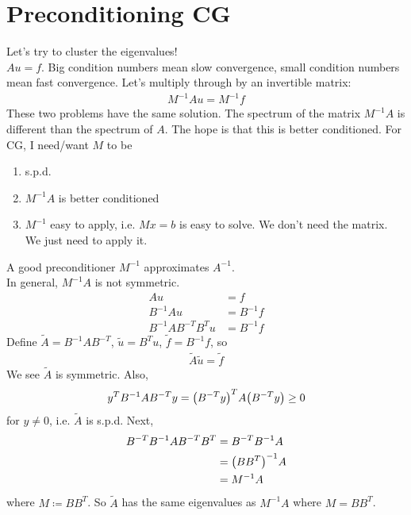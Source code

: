 \documentclass{article}
\begin{document}
    \section{Preconditioning CG}
        Let's try to cluster the eigenvalues! \\

        $Au = f$.  Big condition numbers mean slow convergence, small condition numbers mean fast convergence.  Let's multiply through by an invertible matrix:
        \begin{align*}
            M^{-1}Au = M^{-1}f
        \end{align*}
        These two problems have the same solution.  The spectrum of the matrix $M^{-1}A$ is different than the spectrum of $A$.  The hope is that this is better conditioned.  For CG, I need/want $M$ to be
        \begin{enumerate}
            \item s.p.d.
            \item $M^{-1}A$ is better conditioned
            \item $M^{-1}$ easy to apply, i.e. $Mx=b$ is easy to solve.  We don't need the matrix.  We just need to apply it.
        \end{enumerate}
        A good preconditioner $M^{-1}$ approximates $A^{-1}$. \\

        In general, $M^{-1}A$ is not symmetric.
        \begin{align*}
            Au &= f \\
            B^{-1}Au &= B^{-1}f \\
            B^{-1}AB^{-T}B^Tu &= B^{-1}f
        \end{align*}
        Define $\tilde{A} = B^{-1}AB^{-T}$, $\tilde{u} = B^Tu$, $\tilde{f} = B^{-1}f$, so
        \begin{align*}
            \tilde{A}\tilde{u} = \tilde{f}
        \end{align*}
        We see $\tilde{A}$ is symmetric.  Also,
        \begin{align*}
            y^TB^{-1}AB^{-T}y = \qty(B^{-T}y)^TA\qty(B^{-T}y) \geq 0
        \end{align*}
        for $y \neq 0$, i.e. $\tilde{A}$ is s.p.d.  Next,
        \begin{align*}
            B^{-T}B^{-1}AB^{-T}B^T &= B^{-T}B^{-1}A \\
            &= \qty(BB^T)^{-1}A \\
            &= M^{-1}A
        \end{align*}
        where $M \coloneqq BB^T$.  So $\tilde{A}$ has the same eigenvalues as $M^{-1}A$ where $M = BB^T$. \\
\end{document}
